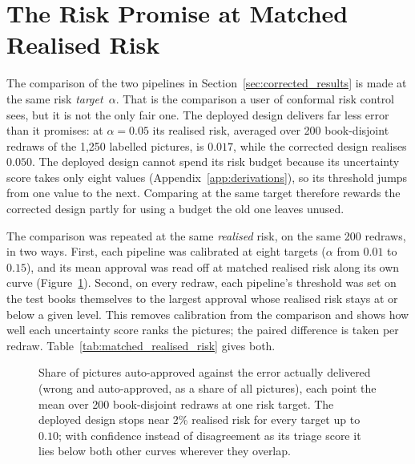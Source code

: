 \section{The Risk Promise at Matched Realised Risk}
\label{sec:matched_realised_risk}

The comparison of the two pipelines in Section~\ref{sec:corrected_results} is made at the same risk \emph{target}~$\alpha$. That is the comparison a user of conformal risk control sees, but it is not the only fair one. The deployed design delivers far less error than it promises: at $\alpha=0.05$ its realised risk, averaged over 200 book-disjoint redraws of the 1,250 labelled pictures, is $0.017$, while the corrected design realises $0.050$. The deployed design cannot spend its risk budget because its uncertainty score takes only eight values (Appendix~\ref{app:derivations}), so its threshold jumps from one value to the next. Comparing at the same target therefore rewards the corrected design partly for using a budget the old one leaves unused.

The comparison was repeated at the same \emph{realised} risk, on the same 200 redraws, in two ways. First, each pipeline was calibrated at eight targets ($\alpha$ from $0.01$ to $0.15$), and its mean approval was read off at matched realised risk along its own curve (Figure~\ref{fig:matched_risk_curve}). Second, on every redraw, each pipeline's threshold was set on the test books themselves to the largest approval whose realised risk stays at or below a given level. This removes calibration from the comparison and shows how well each uncertainty score ranks the pictures; the paired difference is taken per redraw. Table~\ref{tab:matched_realised_risk} gives both.

\begin{figure}[H]
\centering
{}
\caption[Auto-approval against realised risk]{Share of pictures auto-approved against the error actually delivered (wrong and auto-approved, as a share of all pictures), each point the mean over 200 book-disjoint redraws at one risk target. The deployed design stops near 2\% realised risk for every target up to $0.10$; with confidence instead of disagreement as its triage score it lies below both other curves wherever they overlap.}
\label{fig:matched_risk_curve}
\end{figure}

